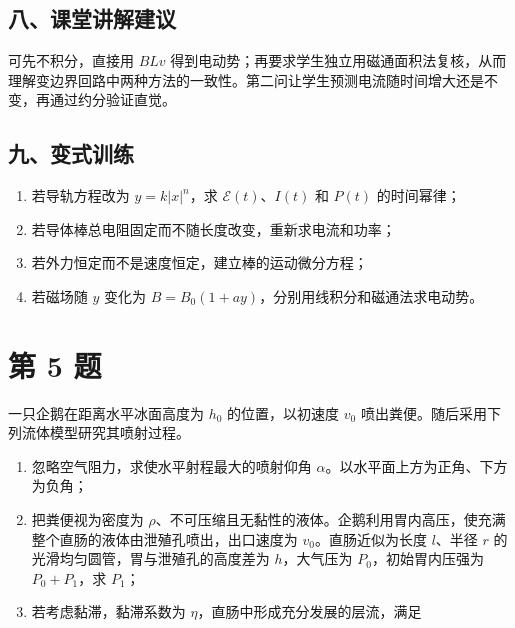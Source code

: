 \documentclass[12pt,a4paper,UTF8]{ctexart}
\newcommand{\tightlist}{\setlength{\itemsep}{0pt}\setlength{\parskip}{0pt}}
\begin{document}
\subsection{八、课堂讲解建议}\label{ux516bux8bfeux5802ux8bb2ux89e3ux5efaux8bae-3}

可先不积分，直接用 \(BLv\)
得到电动势；再要求学生独立用磁通面积法复核，从而理解变边界回路中两种方法的一致性。第二问让学生预测电流随时间增大还是不变，再通过约分验证直觉。

\subsection{九、变式训练}\label{ux4e5dux53d8ux5f0fux8badux7ec3-3}

\begin{enumerate}
\def\labelenumi{\arabic{enumi}.}
\tightlist
\item
  若导轨方程改为 \(y=k|x|^n\)，求 \(\mathcal E(t)\)、\(I(t)\) 和
  \(P(t)\) 的时间幂律；
\item
  若导体棒总电阻固定而不随长度改变，重新求电流和功率；
\item
  若外力恒定而不是速度恒定，建立棒的运动微分方程；
\item
  若磁场随 \(y\) 变化为 \(B=B_0(1+ay)\)，分别用线积分和磁通法求电动势。
\end{enumerate}

\newpage

\section{第 5 题}\label{ux7b2c-5-ux9898}

一只企鹅在距离水平冰面高度为 \(h_0\) 的位置，以初速度 \(v_0\)
喷出粪便。随后采用下列流体模型研究其喷射过程。

\begin{enumerate}
\def\labelenumi{\arabic{enumi}.}
\tightlist
\item
  忽略空气阻力，求使水平射程最大的喷射仰角
  \(\alpha\)。以水平面上方为正角、下方为负角；
\item
  把粪便视为密度为
  \(\rho\)、不可压缩且无黏性的液体。企鹅利用胃内高压，使充满整个直肠的液体由泄殖孔喷出，出口速度为
  \(v_0\)。直肠近似为长度 \(l\)、半径 \(r\)
  的光滑均匀圆管，胃与泄殖孔的高度差为 \(h\)，大气压为
  \(P_0\)，初始胃内压强为 \(P_0+P_1\)，求 \(P_1\)；
\item
  若考虑黏滞，黏滞系数为 \(\eta\)，直肠中形成充分发展的层流，满足
\end{enumerate}
\end{document}
